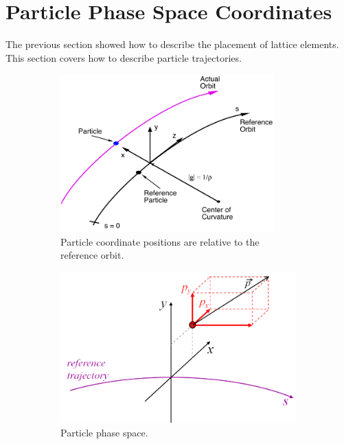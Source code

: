 \documentclass{hitec}
\newcommand{\Section}[1]{\section{#1}\vspace*{-1ex}}
\begin{document}
\Section{Particle Phase Space Coordinates}

The previous section showed how to describe the placement of lattice elements. This section
covers how to describe particle trajectories. 


\begin{figure}[tb]
  \centering
  \begin{subfigure}[b]{0.48\textwidth}
    \includegraphics[width=0.9\textwidth]{local-coords.pdf}
    \caption{Particle coordinate positions are relative to the reference orbit.}
    \label{f:part.coords}
  \end{subfigure}
  \hfil
  \begin{subfigure}[b]{0.48\textwidth}
    \includegraphics[width=\textwidth]{CoordinateSystem1.pdf}
    \caption{Particle phase space.}
    \label{f:phase.space}
  \end{subfigure}
  \caption{}
\end{figure}
\end{document}
